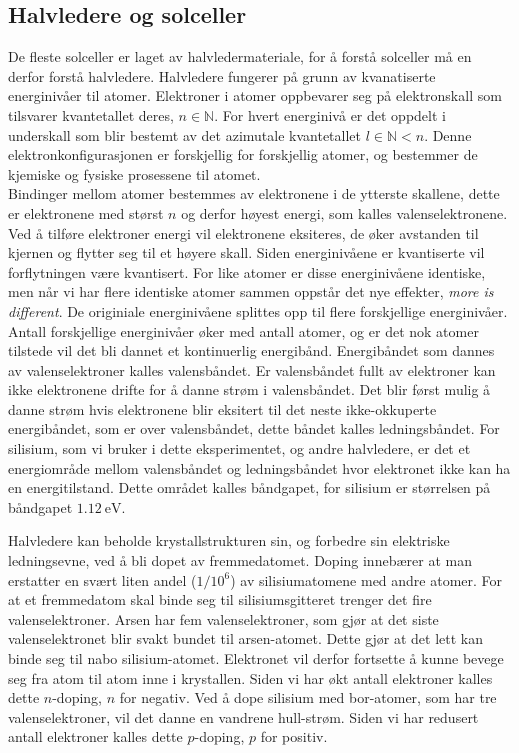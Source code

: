 \documentclass[%
 reprint,
 amsmath,amssymb,
 aps,
 norsk,
 booktabs
]{revtex4-1}
\begin{document}
\subsection{Halvledere og solceller}
De fleste solceller er laget av halvledermateriale, for å forstå solceller må en derfor forstå halvledere. Halvledere fungerer på grunn av kvanatiserte energinivåer til atomer. Elektroner i atomer oppbevarer seg på elektronskall som tilsvarer kvantetallet deres, $n\in\mathbb{N}$. For hvert energinivå er det oppdelt i underskall som blir bestemt av det azimutale kvantetallet $l \in \mathbb{N} < n$. Denne elektronkonfigurasjonen er forskjellig for forskjellig atomer, og bestemmer de kjemiske og fysiske prosessene til atomet.\\
Bindinger mellom atomer bestemmes av elektronene i de ytterste skallene, dette er elektronene med størst $n$ og derfor høyest energi, som kalles valenselektronene. Ved å tilføre elektroner energi vil elektronene eksiteres, de øker avstanden til kjernen og flytter seg til et høyere skall. Siden energinivåene er kvantiserte vil forflytningen være kvantisert. For like atomer er disse energinivåene identiske, men når vi har flere identiske atomer sammen oppstår det nye effekter, \textit{more is different}. De originiale energinivåene splittes opp til flere forskjellige energinivåer. Antall forskjellige energinivåer øker med antall atomer, og er det nok atomer tilstede vil det bli dannet et kontinuerlig energibånd. Energibåndet som dannes av valenselektroner kalles valensbåndet. Er valensbåndet fullt av elektroner kan ikke elektronene drifte for å danne strøm i valensbåndet. Det blir først mulig å danne strøm hvis elektronene blir eksitert til det neste ikke-okkuperte energibåndet, som er over valensbåndet, dette båndet kalles ledningsbåndet. For silisium, som vi bruker i dette eksperimentet, og andre halvledere, er det et energiområde mellom valensbåndet og ledningsbåndet hvor elektronet ikke kan ha en energitilstand. Dette området kalles båndgapet, for silisium er størrelsen på båndgapet $\SI{1.12}{\electronvolt}$.\par
Halvledere kan beholde krystallstrukturen sin, og forbedre sin elektriske ledningsevne, ved å bli dopet av fremmedatomet. Doping innebærer at man erstatter en svært liten andel ($1/10^6$) av silisiumatomene med andre atomer. For at et fremmedatom skal binde seg til silisiumsgitteret trenger det fire valenselektroner. Arsen har fem valenselektroner, som gjør at det siste valenselektronet blir svakt bundet til arsen-atomet. Dette gjør at det lett kan binde seg til nabo silisium-atomet. Elektronet vil derfor fortsette å kunne bevege seg fra atom til atom inne i krystallen. Siden vi har økt antall elektroner kalles dette $n$-doping, $n$ for negativ. Ved å dope silisium med bor-atomer, som har tre valenselektroner, vil det danne en vandrene hull-strøm. Siden vi har redusert antall elektroner kalles dette $p$-doping, $p$ for positiv.\\
\end{document}
